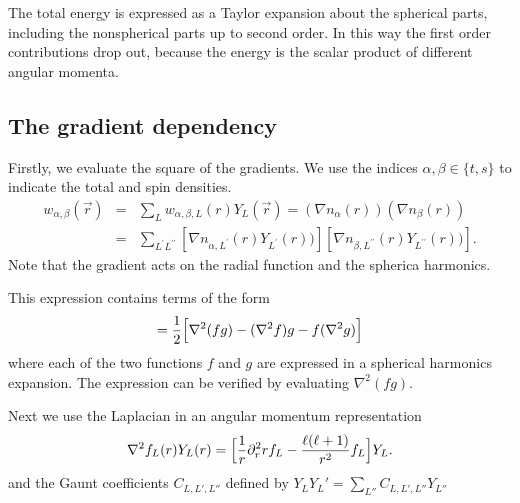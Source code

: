 \documentclass[11pt,a4paper]{report}
\begin{document}
The total energy is expressed as a Taylor expansion about the
spherical parts, including the nonspherical parts up to second order.
In this way the first order contributions drop out, because the energy
is the scalar product of different angular momenta.

\subsection{The gradient dependency}
Firstly, we evaluate the square of the gradients. We use the indices
$\alpha,\beta\in\{t,s\}$ to indicate the total and spin densities.
\begin{eqnarray}
w_{\alpha,\beta}(\vec{r})&=&\sum_L w_{\alpha,\beta,L}(r) Y_L(\vec{r})
=(\nabla n_{\alpha}(r))(\nabla n_{\beta}(r))
\nonumber\\
&=&\sum_{L^\prime L^{\prime\prime}}
[\nabla n_{\alpha,L^\prime}(r)Y_{L^\prime}(r))]
[\nabla n_{\beta,L^{\prime\prime}}(r)Y_{L^{\prime\prime}}(r))]
.
\end{eqnarray}
Note that the gradient acts on the radial function and the spherica
harmonics.

This expression contains terms of the form
\begin{equation}
[\nabla{f}][\nabla{g}]=\frac{1}{2} \Bigl[ \nabla^2(fg)-(\nabla^2 f)g
-f(\nabla^2 g)\Bigr]
\end{equation}
where each of the two functions $f$ and $g$ are expressed in a
spherical harmonics expansion.  The expression can be verified by
evaluating $\nabla^2(fg)$.

Next we use the Laplacian in an angular momentum representation
\begin{equation}
\nabla^2 f_L(r)Y_L(r)= \Bigl[{1\over{r}}\partial_r^2 r f_L
 -{{\ell(\ell+1)}\over{r^2}}f_L\Bigr]Y_L.
\end{equation}
and the Gaunt coefficients $C_{L,L',L''}$ defined by
$Y_LY_L'=\sum_{L''}C_{L,L',L''}Y_{L''}$
\end{document}
